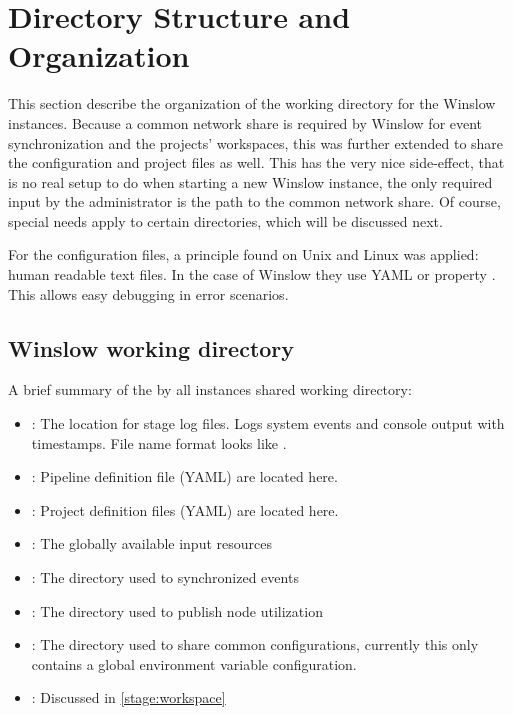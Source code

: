 \section{Directory Structure and Organization}

This section describe the organization of the working directory for the Winslow instances.
Because a common network share is required by Winslow for event synchronization and the projects' workspaces, this was further extended to share the configuration and project files as well.
This has the very nice side-effect, that is no real setup to do when starting a new Winslow instance, the only required input by the administrator is the path to the common network share.
Of course, special needs apply to certain directories, which will be discussed next.

For the configuration files, a principle found on Unix and Linux was applied: human readable text files.
In the case of Winslow they use YAML or property .
This allows easy debugging in error scenarios. 

\subsection{Winslow working directory}

A brief summary of the by all instances shared working directory:

\begin{itemize}
	\item {}: The location for stage log files. Logs system events and console output with timestamps. File name format looks like .
	\item {}: Pipeline definition file (YAML) are located here.
	\item {}: Project definition files (YAML) are located here.
	\item {}: The globally available input resources 
	\item {}: The directory used to synchronized events 
	\item {}: The directory used to publish node utilization 
	\item {}: The directory used to share common configurations, currently this only contains a global environment variable configuration.
	\item {}: Discussed in \autoref{stage:workspace}
\end{itemize}

